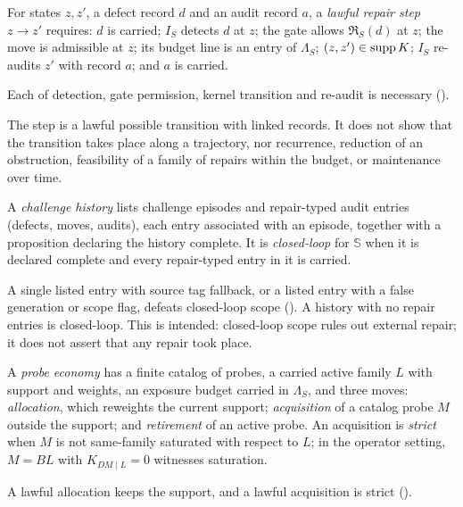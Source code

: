\begin{definition}\label{def:d4-step}
For states $z, z'$, a defect record $d$ and an audit record $a$, a \emph{lawful repair step}
$z \to z'$ requires: $d$ is carried; $I_S$ detects $d$ at $z$; the gate allows $\mathfrak R_S(d)$ at
$z$; the move is admissible at $z$; its budget line is an entry of $\Lambda_S$; $(z, z') \in \operatorname{supp} K$;
$I_S$ re-audits $z'$ with record $a$; and $a$ is carried.
\end{definition}

Each of detection, gate permission, kernel transition and re-audit is necessary ().

The step is a lawful possible transition with linked records. It does not show that the transition
takes place along a trajectory, nor recurrence, reduction of an obstruction, feasibility of a family
of repairs within the budget, or maintenance over time.

\begin{definition}\label{def:d5}
A \emph{challenge history} lists challenge episodes and repair-typed audit entries (defects, moves,
audits), each entry associated with an episode, together with a proposition declaring the history
complete. It is \emph{closed-loop} for $\mathbb S$ when it is declared complete and every
repair-typed entry in it is carried.
\end{definition}


A single listed entry with source tag fallback, or a listed entry with a false generation or scope
flag, defeats closed-loop scope (). A history with no
repair entries is closed-loop. This is intended: closed-loop scope rules out
external repair; it does not assert that any repair took place.

\begin{definition}\label{def:d6}
A \emph{probe economy} has a finite catalog of probes, a carried active family $L$ with support and
weights, an exposure budget carried in $\Lambda_S$, and three moves: \emph{allocation}, which
reweights the current support; \emph{acquisition} of a catalog probe $M$ outside the support; and
\emph{retirement} of an active probe. An acquisition is \emph{strict} when $M$ is not same-family
saturated with respect to $L$; in the operator setting, $M = BL$ with $K_{DM\mid L} = 0$ witnesses
saturation.
\end{definition}

A lawful allocation keeps the support, and a lawful acquisition is strict ().


